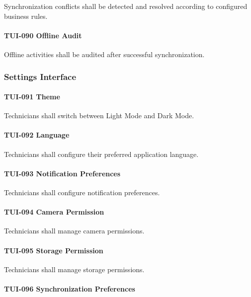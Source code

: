 Synchronization conflicts shall be detected and resolved according to
configured business rules.

\paragraph{TUI-090 Offline Audit}

Offline activities shall be audited after successful synchronization.


\subsubsection*{Settings Interface}

\paragraph{TUI-091 Theme}

Technicians shall switch between Light Mode and Dark Mode.

\paragraph{TUI-092 Language}

Technicians shall configure their preferred application language.

\paragraph{TUI-093 Notification Preferences}

Technicians shall configure notification preferences.

\paragraph{TUI-094 Camera Permission}

Technicians shall manage camera permissions.

\paragraph{TUI-095 Storage Permission}

Technicians shall manage storage permissions.

\paragraph{TUI-096 Synchronization Preferences}

